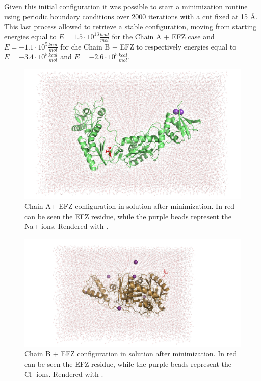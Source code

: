 \documentclass[12pt]{article}
\begin{document}
Given this initial configuration it was possible to start a minimization routine using periodic boundary conditions over 2000 iterations with a cut fixed at 15 \AA. This last process allowed to retrieve a stable configuration, moving from starting energies equal to $E=1.5\cdot 10^{13} \frac{kcal}{mol}$ for the Chain A + EFZ case and $E=-1.1\cdot 10^{5} \frac{kcal}{mol}$ for che Chain B + EFZ to respectively energies equal to $E=-3.4\cdot 10^{5} \frac{kcal}{mol}$ and $E=-2.6\cdot 10^{5} \frac{kcal}{mol}$.

\begin{figure}
    \centering
    \includegraphics[width=0.8\linewidth, clip, trim= 0 0 0 0]{../figures/chain_a_efz_solv.png}
    \caption{Chain A+ EFZ configuration in solution after minimization. In red can be seen the EFZ residue, while the purple beads represent the Na+ ions. Rendered with \cite[Pymol]{pymol}.\label{fig:chain_a_efz_solv}}
\end{figure}

\begin{figure}
    \centering
    \includegraphics[width=0.8\linewidth, clip, trim= 0 0 0 0]{../figures/chain_b_efz_solv.png}
    \caption{Chain B + EFZ configuration in solution after minimization. In red can be seen the EFZ residue, while the purple beads represent the Cl- ions. Rendered with \cite[Pymol]{pymol}.\label{fig:chain_b_efz_solv}}
\end{figure}
\end{document}

